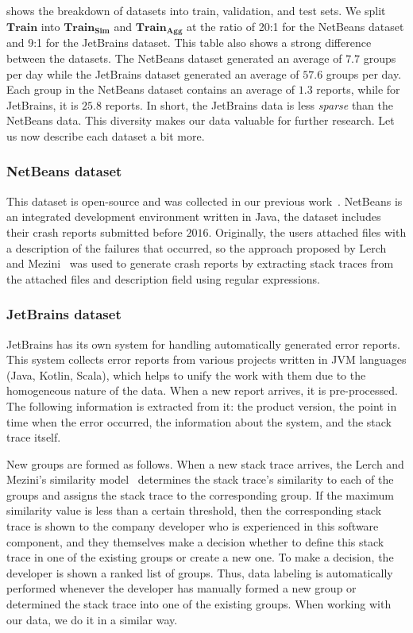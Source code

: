  shows the breakdown of datasets into train, validation, and test sets.
We split $\mathrm{\textbf{Train}}$ into $\mathrm{\textbf{Train}_\textbf{Sim}}$ and $\mathrm{\textbf{Train}_\textbf{Agg}}$ at the ratio of 20:1 for the NetBeans dataset and 9:1 for the JetBrains dataset.
This table also shows a strong difference between the datasets.
The NetBeans dataset generated an average of $7.7$ groups per day while the JetBrains dataset generated an average of $57.6$ groups per day.
Each group in the NetBeans dataset contains an average of $1.3$ reports, while for JetBrains, it is $25.8$ reports.
In short, the JetBrains data is less \textit{sparse} than the NetBeans data.
This diversity makes our data valuable for further research. Let us now describe each dataset a bit more.

\subsubsection{NetBeans dataset}
This dataset is open-source and was collected in our previous work~\cite{s3m}. NetBeans is an integrated development environment written in Java, the dataset includes their crash reports submitted before $2016$. Originally, the users attached files with a description of the failures that occurred, so the approach proposed by Lerch and Mezini~\cite{lerch} was used to generate crash reports by extracting stack traces from the attached files and description field using regular expressions.

\subsubsection{JetBrains dataset}\label{sec:jb_dataset}
JetBrains has its own system for handling automatically generated error reports. This system collects error reports from various projects written in JVM languages (Java, Kotlin, Scala), which helps to unify the work with them due to the homogeneous nature of the data. When a new report arrives, it is pre-processed. The following information is extracted from it: the product version, the point in time when the error occurred, the information about the system, and the stack trace itself.

New groups are formed as follows. When a new stack trace arrives, the Lerch and Mezini's similarity model~\cite{lerch} determines the stack trace's similarity to each of the groups and assigns the stack trace to the corresponding group. If the maximum similarity value is less than a certain threshold, then the corresponding stack trace is shown to the company developer who is experienced in this software component, and they themselves make a decision whether to define this stack trace in one of the existing groups or create a new one. To make a decision, the developer is shown a ranked list of groups.
Thus, data labeling is automatically performed whenever the developer has manually formed a new group or determined the stack trace into one of the existing groups. When working with our data, we do it in a similar way.


